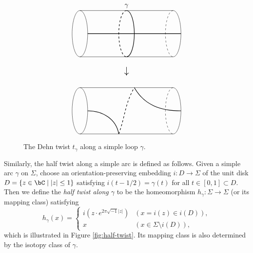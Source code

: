 \documentclass[12pt]{amsart}
\numberwithin{equation}{section}
\theoremstyle{plain}
\theoremstyle{definition}
\begin{document}
\begin{figure}[h]
    \centering
    \begin{displaymath}
        \begin{tikzpicture}[scale=0.8]
            \draw (0,0+5)--(6,0+5);
            \draw (0,3+5)--(6,3+5);

            \draw[thick] (0.5, 1.5+5)--(6.5, 1.5+5);

            \draw (0, 1.5+5) circle[x radius=0.5, y radius=1.5];

            \draw(6, 0+5)arc(-90:90:0.5 and 1.5);
            \draw[dashed](6, 3+5)arc(90:270:0.5 and 1.5);

            \draw[thick](3, 0+5)arc(-90:90:0.5 and 1.5);
            \draw[thick, dashed](3, 3+5)arc(90:270:0.5 and 1.5);


            \draw(3, 3+5) node[above]{$\gamma$};

            \draw(3, -0.5+5) node[below]{\Large$\downarrow$};


            \draw (0,0)--(6,0);
            \draw (0,3)--(6,3);

            \draw (0, 1.5) circle[x radius=0.5, y radius=1.5];

            \draw(6, 0)arc(-90:90:0.5 and 1.5);
            \draw[dashed](6, 3)arc(90:270:0.5 and 1.5);

            \draw[thick](0.5, 1.5) to[out=0,in=100](2.5, 0);
            \draw[thick, dashed](2.5, 0) to[out=70,in=-120](3.5, 3);
            \draw[thick](3.5, 3) to[out=-60,in=180](6.5, 1.5);
        \end{tikzpicture}
    \end{displaymath}
    \caption{The Dehn twist $t_\gamma$ along a simple loop $\gamma$.}
    \label{fig:Dehn-twist}
\end{figure}


Similarly, the half twist along a simple arc is defined as follows. Given a simple arc $\gamma$ on $\Sigma$, choose an orientation-preserving embedding $i \colon D \to \Sigma$ of the unit disk $D = \{z \in \bC \mid |z| \leq 1\}$ satisfying $i(t - 1/2) = \gamma(t)$ for all $t \in [0, 1] \subset D$.
Then we define the \emph{half twist along $\gamma$} to be the homeomorphism $h_\gamma \colon \Sigma \to \Sigma$ (or its mapping class) satisfying
\begin{equation}
    h_\gamma(x) = \begin{cases}
        i(z \cdot e^{2\pi \sqrt{-1} |z|}) & (x = i(z) \in i(D)),           \\
        x                                 & (x \in \Sigma \setminus i(D)),
    \end{cases}
\end{equation}
which is illustrated in Figure \ref{fig:half-twist}.
Its mapping class is also determined by the isotopy class of $\gamma$.
\end{document}
